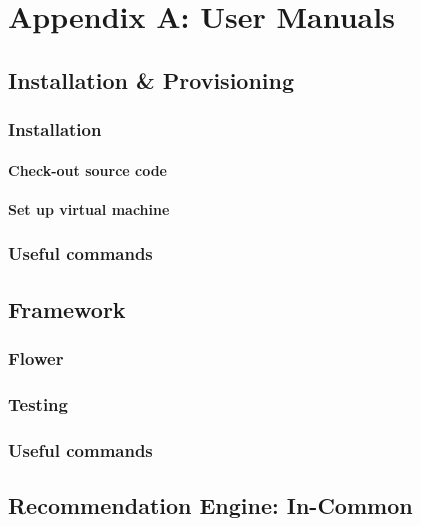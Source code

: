 \chapter*{Appendix A: User Manuals}

\section{Installation \& Provisioning}

\subsection{Installation}

\subsubsection{Check-out source code}

\subsubsection{Set up virtual machine}

\subsection{Useful commands}

\section{Framework}

\subsection{Flower}

\subsection{Testing}

\subsection{Useful commands}

\section{Recommendation Engine: In-Common}

